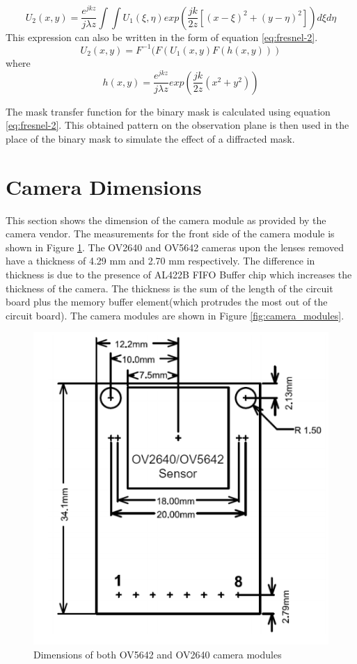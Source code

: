 \begin{equation}
\label{eq:fresnel-1}
U_2(x,y) = \frac{e^{jkz}}{j\lambda z}\int \int U_1(\xi, \eta )exp(\frac{jk}{2z}[(x - \xi)^2 + (y - \eta)^2])d\xi d\eta
\end{equation}
This expression can also be written in the form of equation \ref{eq:fresnel-2}.
\begin{equation}
\label{eq:fresnel-2}
U_2(x,y) = F^{-1}(F(U_1(x,y)F(h(x,y)))
\end{equation}
where
\begin{equation}
\label{eq:fresnel-3}
h(x,y) = \frac{e^{jkz}}{j\lambda z}exp(\frac{jk}{2z}(x^2 + y^2))
\end{equation}

The mask transfer function for the binary mask is calculated using equation \ref{eq:fresnel-2}. This obtained pattern on the observation plane is then used in the place of the binary mask to simulate the effect of a diffracted mask. 
\section*{Camera Dimensions}
This section shows the dimension of the camera module as provided by the camera vendor. The measurements for the front side of the camera module is shown in Figure \ref{fig:arducam_mech}. The OV2640 and OV5642 cameras upon the lenses removed have a thickness of 4.29 mm and 2.70 mm respectively. The difference in thickness is due to the presence of AL422B FIFO Buffer chip which increases the thickness of the camera. The thickness is the sum of the length of the circuit board plus the memory buffer element(which protrudes the most out of the circuit board). The camera modules are shown in Figure \ref{fig:camera_modules}.

\begin{figure}[!htbp]
\centering
\includegraphics[width = 0.50 \linewidth]{pics/arducam_mech}
\caption{Dimensions of both OV5642 and OV2640 camera modules}
\label{fig:arducam_mech}
\end{figure}

